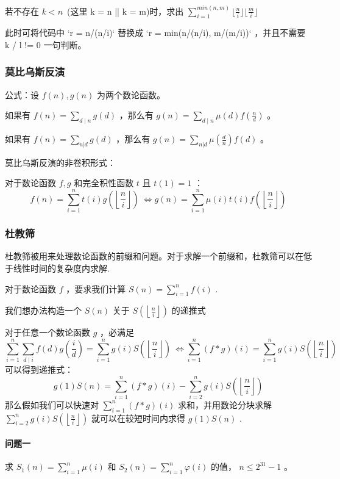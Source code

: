 \documentclass[UTF8]{ctexart}
\begin{document}
若不存在 $k < n$\ (这里 k = n || k = m)时，求出 $\sum_{i=1}^{min(n,m)} \lfloor \frac{n}{i} \rfloor \lfloor \frac{m}{i} \rfloor$

此时可将代码中 `r = n/(n/i)` 替换成 `r = min(n/(n/i), m/(m/i))` ，并且不需要 k / l != 0 一句判断。

\subsubsection{莫比乌斯反演}
公式：设 $f(n),g(n)$ 为两个数论函数。

如果有 $f(n)=\sum_{d\mid n}g(d)$ ，那么有 $g(n)=\sum_{d\mid n}\mu(d)f(\frac{n}{d})$ 。

如果有 $f(n)=\sum_{n|d}g(d)$ ，那么有 $g(n)=\sum_{n|d}\mu(\frac{d}{n})f(d)$ 。

莫比乌斯反演的非卷积形式：

对于数论函数 $f,g$ 和完全积性函数 $t$ 且 $t(1)=1$ ：
$$
f(n)=\sum_{i=1}^nt(i)g\left(\left\lfloor\frac{n}{i}\right\rfloor\right)\ \iff g(n)=\sum_{i=1}^n\mu(i)t(i)f\left(\left\lfloor\frac{n}{i}\right\rfloor\right)
$$

\subsubsection{杜教筛}
杜教筛被用来处理数论函数的前缀和问题。对于求解一个前缀和，杜教筛可以在低于线性时间的复杂度内求解.

对于数论函数 $f$ ，要求我们计算 $S(n)=\sum_{i=1}^{n}f(i)$ .

我们想办法构造一个 $S(n)$ 关于 $S\left(\left\lfloor\frac{n}{i}\right\rfloor\right)$ 的递推式

对于任意一个数论函数 $g$ ，必满足
$$
\sum_{i=1}^{n}\sum_{d \mid i}f(d)g\left(\frac{i}{d}\right)=\sum_{i=1}^{n}g(i)S\left(\left\lfloor\frac{n}{i}\right\rfloor\right)\ \Leftrightarrow \sum_{i=1}^{n}(f\ast g)(i)=\sum_{i=1}^{n}g(i)S\left(\left\lfloor\frac{n}{i}\right\rfloor\right)
$$
可以得到递推式：
$$
g(1)S(n)=\sum_{i=1}^n(f\ast g)(i)-\sum_{i=2}^ng(i)S\left(\left\lfloor\frac{n}{i}\right\rfloor\right)
$$
那么假如我们可以快速对 $\sum_{i=1}^n(f \ast g)(i)$ 求和，并用数论分块求解 $\sum_{i=2}^ng(i)S\left(\left\lfloor\frac{n}{i}\right\rfloor\right)$ 就可以在较短时间内求得 $g(1)S(n)$ .

\paragraph{问题一} 求 $S_1(n)= \sum_{i=1}^{n} \mu(i)$ 和 $S_2(n)= \sum_{i=1}^{n} \varphi(i)$ 的值， $n\le 2^{31} -1$ 。
\end{document}
